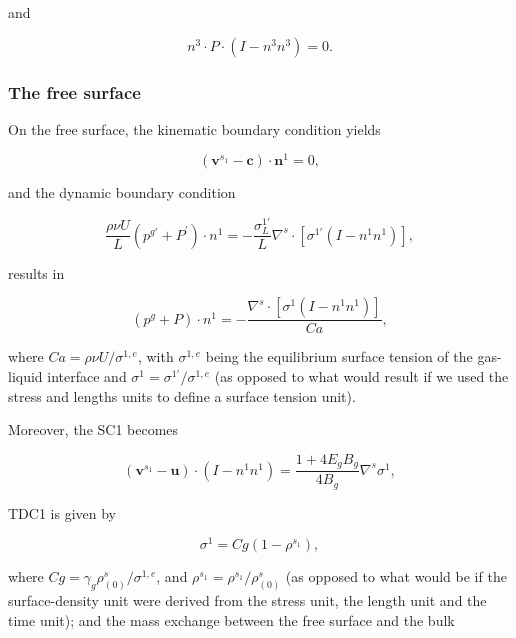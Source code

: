 \documentclass{article}
\begin{document}
and

\begin{equation}
n^3\cdot P\cdot (I - n^3 n^3) = 0. \tag{2.43}
\end{equation}

\subsubsection{The free surface}

On the free surface, the kinematic boundary condition yields

\begin{equation}
(\pmb{v}^{s_1} - \pmb {c})\cdot \pmb{n}^1 = 0, \tag{2.44}
\end{equation}

and the dynamic boundary condition

\begin{equation}
\frac{\rho\nu U}{L} (p^{g\prime} + P^{\prime})\cdot n^{1} = -\frac{\sigma_{L}^{1\prime}}{L}\nabla^{s}\cdot \left[\sigma^{1\prime}(I - n^{1}n^{1})\right], \tag{2.45}
\end{equation}

results in

\begin{equation}
(p^{g} + P)\cdot n^{1} = -\frac{\nabla^{s}\cdot[\sigma^{1}(I - n^{1}n^{1})]}{Ca}, \tag{2.46}
\end{equation}

where \(Ca = \rho \nu U / \sigma^{1,e}\), with \(\sigma^{1,e}\) being the equilibrium surface tension of the gas-liquid interface and \(\sigma^{1} = \sigma^{1\prime} / \sigma^{1,e}\) (as opposed to what would result if we used the stress and lengths units to define a surface tension unit).

Moreover, the SC1 becomes

\begin{equation}
(\pmb{v}^{s_1} - \pmb {u})\cdot (I - n^1 n^1) = \frac{1 + 4E_gB_g}{4B_g}\nabla^s\sigma^1, \tag{2.47}
\end{equation}

TDC1 is given by

\begin{equation}
\sigma^1 = Cg(1 - \rho^{s_1}), \tag{2.48}
\end{equation}

where \(Cg = \gamma_{g}\rho_{(0)}^{s} / \sigma^{1,e}\), and \(\rho^{s_1} = \rho^{s_1} / \rho_{(0)}^{s}\) (as opposed to what would be if the surface-density unit were derived from the stress unit, the length unit and the time unit); and the mass exchange between the free surface and the bulk
\end{document}
